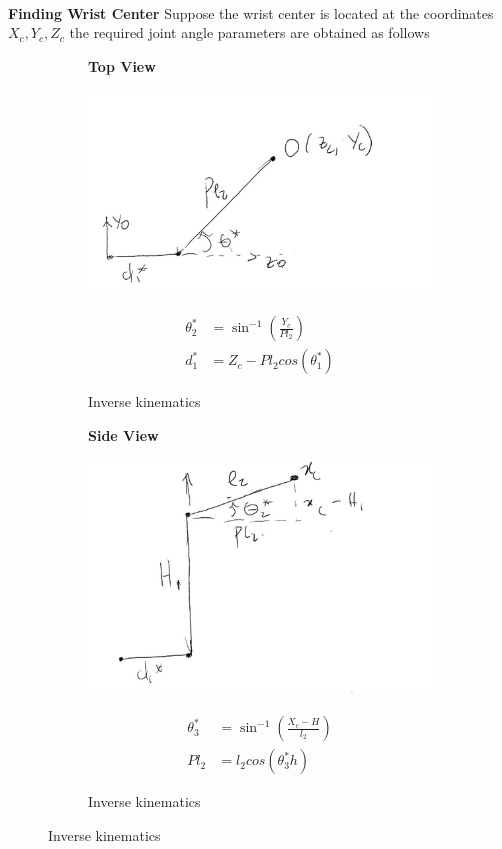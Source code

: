 \documentclass[12pt]{article}
\begin{document}
\paragraph{}
\textbf{Finding Wrist Center}
Suppose the wrist center is located at the coordinates $X_c, Y_c, Z_c$ the required joint angle 
parameters are obtained as follows
\begin{figure}[H]
  \begin{subfigure}{.5\textwidth}
    \centering
    \textbf{Top View}\par\medskip
    \includegraphics[scale = 0.5]{topview.png}\\[0.0 cm]	%
    \caption{Inverse kinematics}
     
\begin{align}
  \theta_2^* &= \sin ^{-1}(\frac{Y_c}{Pl_2}) \\
  d_1^* &= Z_c -Pl_2cos(\theta_1^*) 
\end{align}
  \end{subfigure}
\begin{subfigure}{.5\textwidth}
    \centering
    \textbf{Side View}\par\medskip
    \includegraphics[scale = 0.5]{sideview.png}\\[0.0 cm]	%
    \caption{Inverse kinematics}
\begin{align}
  \theta_3^* &= \sin ^{-1}(\frac{X_c - H}{l_2})  \\
Pl_2 &= l_2cos(\theta_3^*h)
\end{align}
\end{subfigure}
\end{figure}
\end{document}
